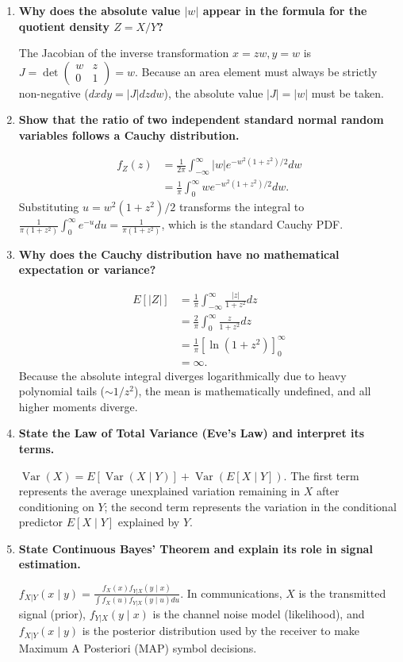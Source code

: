 \documentclass[12pt,a4paper]{article}
\newcommand{\Q}[1]{\textbf{#1}\par\noindent\ignorespaces}
\begin{document}
\begin{tcolorbox}[exambox, title={\textbf{Frequently Asked / Viva Questions}}]
\begin{enumerate}[topsep=0pt, label=\textbf{Q\arabic*.}, itemsep=5pt]
  \item \Q{Why does the absolute value $|w|$ appear in the formula for the quotient density $Z = X/Y$?}
  The Jacobian of the inverse transformation $x = z w, y = w$ is $J = \det \begin{pmatrix} w & z \\ 0 & 1 \end{pmatrix} = w$. Because an area element must always be strictly non-negative ($dx dy = |J| dz dw$), the absolute value $|J| = |w|$ must be taken.

  \item \Q{Show that the ratio of two independent standard normal random variables follows a Cauchy distribution.}

  \[
    \begin{aligned}
      f_Z(z) &= \frac{1}{2\pi} \int_{-\infty}^\infty |w| e^{-w^2(1+z^2)/2} dw \\[3pt]
      &= \frac{1}{\pi} \int_0^\infty w e^{-w^2(1+z^2)/2} dw.
    \end{aligned}
  \]
   Substituting $u = w^2(1+z^2)/2$ transforms the integral to $\frac{1}{\pi(1+z^2)} \int_0^\infty e^{-u} du = \frac{1}{\pi(1+z^2)}$, which is the standard Cauchy PDF.
  \item \Q{Why does the Cauchy distribution have no mathematical expectation or variance?}

  \[
    \begin{aligned}
      E[|Z|] &= \frac{1}{\pi} \int_{-\infty}^\infty \frac{|z|}{1+z^2} dz \\[3pt]
      &= \frac{2}{\pi} \int_0^\infty \frac{z}{1+z^2} dz \\[3pt]
      &= \frac{1}{\pi} \left[\ln(1+z^2)\right]_0^\infty \\[3pt]
      &= \infty.
    \end{aligned}
  \]
   Because the absolute integral diverges logarithmically due to heavy polynomial tails ($\sim 1/z^2$), the mean is mathematically undefined, and all higher moments diverge.

  \item \Q{State the Law of Total Variance (Eve's Law) and interpret its terms.}
  $\operatorname{Var}(X) = E[\operatorname{Var}(X \mid Y)] + \operatorname{Var}(E[X \mid Y])$. The first term represents the average unexplained variation remaining in $X$ after conditioning on $Y$; the second term represents the variation in the conditional predictor $E[X \mid Y]$ explained by $Y$.

  \item \Q{State Continuous Bayes' Theorem and explain its role in signal estimation.}
  $f_{X|Y}(x \mid y) = \frac{f_X(x) f_{Y|X}(y \mid x)}{\int f_X(u) f_{Y|X}(y \mid u) du}$. In communications, $X$ is the transmitted signal (prior), $f_{Y|X}(y \mid x)$ is the channel noise model (likelihood), and $f_{X|Y}(x \mid y)$ is the posterior distribution used by the receiver to make Maximum A Posteriori (MAP) symbol decisions.
\end{enumerate}
\end{tcolorbox}
\end{document}

